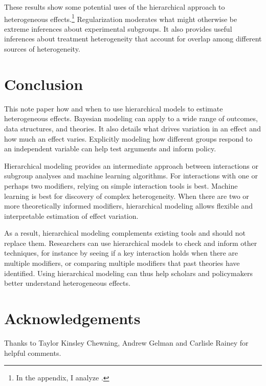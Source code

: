 \documentclass[12pt]{article}
\begin{document}
These results show some potential uses of the hierarchical approach to heterogeneous effects.\footnote{In the appendix, I analyze \citet{BushPrather2020}.}
Regularization moderates what might otherwise be extreme inferences about experimental subgroups.
It also provides useful inferences about treatment heterogeneity that account for overlap among different sources of heterogeneity.



\section{Conclusion}


This note paper how and when to use hierarchical models to estimate heterogeneous effects. 
Bayesian modeling can apply to a wide range of outcomes, data structures, and theories. 
It also details what drives variation in an effect and how much an effect varies. 
Explicitly modeling how different groups respond to an independent variable can help test arguments and inform policy.  


Hierarchical modeling provides an intermediate approach between interactions or subgroup analyses and machine learning algorithms. 
For interactions with one or perhaps two modifiers, relying on simple interaction tools is best. 
Machine learning is best for discovery of complex heterogeneity.
When there are two or more theoretically informed modifiers, hierarchical modeling allows flexible and interpretable estimation of effect variation. 


As a result, hierarchical modeling complements existing tools and should not replace them. 
Researchers can use hierarchical models to check and inform other techniques, for instance by seeing if a key interaction holds when there are multiple modifiers, or comparing multiple modifiers that past theories have identified. 
Using hierarchical modeling can thus help scholars and policymakers better understand heterogeneous effects.


\section*{Acknowledgements}

Thanks to Taylor Kinsley Chewning, Andrew Gelman and Carlisle Rainey for helpful comments.

\singlespace
 


%
\end{document}
